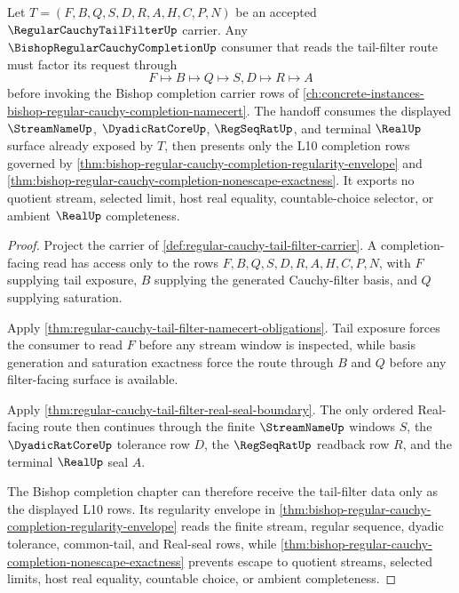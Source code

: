 \begin{theorem}
\label{thm:regular-cauchy-tail-filter-bishop-completion-handoff}
Let $T=(F,B,Q,S,D,R,A,H,C,P,N)$ be an accepted $\RegularCauchyTailFilterUp$ carrier. Any $\BishopRegularCauchyCompletionUp$ consumer that reads the tail-filter route must factor its request through
$$
F \longmapsto B \longmapsto Q \longmapsto S,D \longmapsto R \longmapsto A
$$
before invoking the Bishop completion carrier rows of \autoref{ch:concrete-instances-bishop-regular-cauchy-completion-namecert}. The handoff consumes the displayed $\StreamNameUp$, $\DyadicRatCoreUp$, $\RegSeqRatUp$, and terminal $\RealUp$ surface already exposed by $T$, then presents only the L10 completion rows governed by \autoref{thm:bishop-regular-cauchy-completion-regularity-envelope} and \autoref{thm:bishop-regular-cauchy-completion-nonescape-exactness}. It exports no quotient stream, selected limit, host real equality, countable-choice selector, or ambient $\RealUp$ completeness.
\end{theorem}
\begin{proof}
Project the carrier of \autoref{def:regular-cauchy-tail-filter-carrier}. A completion-facing read has access only to the rows $F,B,Q,S,D,R,A,H,C,P,N$, with $F$ supplying tail exposure, $B$ supplying the generated Cauchy-filter basis, and $Q$ supplying saturation.

Apply \autoref{thm:regular-cauchy-tail-filter-namecert-obligations}. Tail exposure forces the consumer to read $F$ before any stream window is inspected, while basis generation and saturation exactness force the route through $B$ and $Q$ before any filter-facing surface is available.

Apply \autoref{thm:regular-cauchy-tail-filter-real-seal-boundary}. The only ordered Real-facing route then continues through the finite $\StreamNameUp$ windows $S$, the $\DyadicRatCoreUp$ tolerance row $D$, the $\RegSeqRatUp$ readback row $R$, and the terminal $\RealUp$ seal $A$.

The Bishop completion chapter can therefore receive the tail-filter data only as the displayed L10 rows. Its regularity envelope in \autoref{thm:bishop-regular-cauchy-completion-regularity-envelope} reads the finite stream, regular sequence, dyadic tolerance, common-tail, and Real-seal rows, while \autoref{thm:bishop-regular-cauchy-completion-nonescape-exactness} prevents escape to quotient streams, selected limits, host real equality, countable choice, or ambient completeness.
\end{proof}

